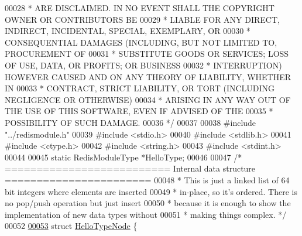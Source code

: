 \begin{DoxyCode}
00028 \textcolor{comment}{ * ARE DISCLAIMED. IN NO EVENT SHALL THE COPYRIGHT OWNER OR CONTRIBUTORS BE}
00029 \textcolor{comment}{ * LIABLE FOR ANY DIRECT, INDIRECT, INCIDENTAL, SPECIAL, EXEMPLARY, OR}
00030 \textcolor{comment}{ * CONSEQUENTIAL DAMAGES (INCLUDING, BUT NOT LIMITED TO, PROCUREMENT OF}
00031 \textcolor{comment}{ * SUBSTITUTE GOODS OR SERVICES; LOSS OF USE, DATA, OR PROFITS; OR BUSINESS}
00032 \textcolor{comment}{ * INTERRUPTION) HOWEVER CAUSED AND ON ANY THEORY OF LIABILITY, WHETHER IN}
00033 \textcolor{comment}{ * CONTRACT, STRICT LIABILITY, OR TORT (INCLUDING NEGLIGENCE OR OTHERWISE)}
00034 \textcolor{comment}{ * ARISING IN ANY WAY OUT OF THE USE OF THIS SOFTWARE, EVEN IF ADVISED OF THE}
00035 \textcolor{comment}{ * POSSIBILITY OF SUCH DAMAGE.}
00036 \textcolor{comment}{ */}
00037 
00038 \textcolor{preprocessor}{#}\textcolor{preprocessor}{include} \textcolor{preprocessor}{"../redismodule.h"}
00039 \textcolor{preprocessor}{#}\textcolor{preprocessor}{include} \textcolor{preprocessor}{<}\textcolor{preprocessor}{stdio}\textcolor{preprocessor}{.}\textcolor{preprocessor}{h}\textcolor{preprocessor}{>}
00040 \textcolor{preprocessor}{#}\textcolor{preprocessor}{include} \textcolor{preprocessor}{<}\textcolor{preprocessor}{stdlib}\textcolor{preprocessor}{.}\textcolor{preprocessor}{h}\textcolor{preprocessor}{>}
00041 \textcolor{preprocessor}{#}\textcolor{preprocessor}{include} \textcolor{preprocessor}{<}\textcolor{preprocessor}{ctype}\textcolor{preprocessor}{.}\textcolor{preprocessor}{h}\textcolor{preprocessor}{>}
00042 \textcolor{preprocessor}{#}\textcolor{preprocessor}{include} \textcolor{preprocessor}{<}\textcolor{preprocessor}{string}\textcolor{preprocessor}{.}\textcolor{preprocessor}{h}\textcolor{preprocessor}{>}
00043 \textcolor{preprocessor}{#}\textcolor{preprocessor}{include} \textcolor{preprocessor}{<}\textcolor{preprocessor}{stdint}\textcolor{preprocessor}{.}\textcolor{preprocessor}{h}\textcolor{preprocessor}{>}
00044 
00045 \textcolor{keyword}{static} RedisModuleType *HelloType;
00046 
00047 \textcolor{comment}{/* ========================== Internal data structure  =======================}
00048 \textcolor{comment}{ * This is just a linked list of 64 bit integers where elements are inserted}
00049 \textcolor{comment}{ * in-place, so it's ordered. There is no pop/push operation but just insert}
00050 \textcolor{comment}{ * because it is enough to show the implementation of new data types without}
00051 \textcolor{comment}{ * making things complex. */}
00052 
\hyperlink{structHelloTypeNode}{00053} \textcolor{keyword}{struct} \hyperlink{structHelloTypeNode}{HelloTypeNode} \{

\end{DoxyCode}
